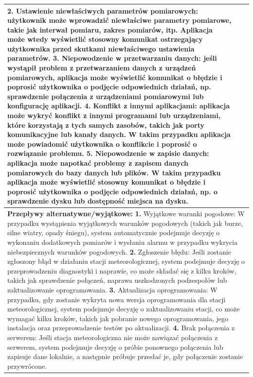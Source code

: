 \documentclass{article}
\begin{document}
\begin{center}
\begin{center}
\begin{tabular}{|l|l|l|}
{        \textbf{2.} Ustawienie niewłaściwych parametrów pomiarowych: użytkownik może wprowadzić niewłaściwe parametry pomiarowe, takie jak interwał pomiaru, zakres pomiarów, itp. Aplikacja może wtedy wyświetlić stosowny komunikat ostrzegający użytkownika przed skutkami niewłaściwego ustawienia parametrów.
        \newline
        \textbf{3.} Niepowodzenie w przetwarzaniu danych: jeśli wystąpił problem z przetwarzaniem danych z urządzeń pomiarowych, aplikacja może wyświetlić komunikat o błędzie i poprosić użytkownika o podjęcie odpowiednich działań, np. sprawdzenie połączenia z urządzeniami pomiarowymi lub konfigurację aplikacji.
        \newline
        \textbf{4.} Konflikt z innymi aplikacjami: aplikacja może wykryć konflikt z innymi programami lub urządzeniami, które korzystają z tych samych zasobów, takich jak porty komunikacyjne lub kanały danych. W takim przypadku aplikacja może powiadomić użytkownika o konflikcie i poprosić o rozwiązanie problemu.
        \newline
        \textbf{5.} Niepowodzenie w zapisie danych: aplikacja może napotkać problemy z zapisem danych pomiarowych do bazy danych lub plików. W takim przypadku aplikacja może wyświetlić stosowny komunikat o błędzie i poprosić użytkownika o podjęcie odpowiednich działań, np. o sprawdzenie dysku lub dostępność miejsca na dysku.} \\
        \hline
        \hline
        \multicolumn{3}{|p{\dimexpr\linewidth-2\tabcolsep-2\arrayrulewidth}|}{\textbf{Przepływy alternatywne/wyjątkowe:}
        \newline
        \textbf{1.} Wyjątkowe warunki pogodowe: W przypadku wystąpienia wyjątkowych warunków pogodowych (takich jak burze, silne wiatry, opady śniegu), system automatycznie podejmuje decyzję o wykonaniu dodatkowych pomiarów i wysłaniu alarmu w przypadku wykrycia niebezpiecznych warunków pogodowych.
        \newline
        \textbf{2.} Zgłoszenie błędu: Jeśli zostanie zgłoszony błąd w działaniu stacji meteorologicznej, system podejmuje decyzję o przeprowadzeniu diagnostyki i naprawie, co może składać się z kilku kroków, takich jak sprawdzenie połączeń, naprawa uszkodzonych podzespołów lub zaktualizowanie oprogramowania.
        \newline
        \textbf{3.} Aktualizacja oprogramowania: W przypadku, gdy zostanie wykryta nowa wersja oprogramowania dla stacji meteorologicznej, system podejmuje decyzję o zaktualizowaniu stacji, co może wymagać kilku kroków, takich jak pobranie nowego oprogramowania, jego instalacja oraz przeprowadzenie testów po aktualizacji.
        \newline
        \textbf{4.} Brak połączenia z serwerem: Jeśli stacja meteorologiczna nie może nawiązać połączenia z serwerem, system podejmuje decyzję o próbie ponownego połączenia lub zapisuje dane lokalnie, a następnie próbuje przesłać je, gdy połączenie zostanie przywrócone.} \\
        \hline
        \end{tabular}
    \end{center}
    \newpage


\end{center}
\end{document}

